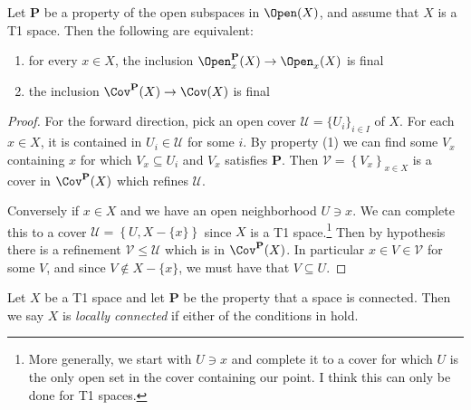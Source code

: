 \documentclass[11pt]{book}
\begin{document}
\begin{proposition}\label{prop:local-properties-cover-properties} 
Let $\mathbf{P}$ be a property of the open subspaces in $\Open(X)$, and assume that $X$ is a T1 space. Then the following are equivalent:
\begin{enumerate}
    \item for every $x\in X$, the inclusion $\Open_x^{\mathbf{P}}(X) \to \Open_x(X)$ is final %
    \item the inclusion $\Cov^{\mathbf{P}}(X) \to \Cov(X)$ is final %
\end{enumerate}
\end{proposition}
\begin{proof} For the forward direction, pick an open cover $\mathcal{U} = \{U_i\}_{i\in I}$ of $X$. For each $x\in X$, it is contained in $U_i\in \mathcal{U}$ for some $i$. By property (1) we can find some $V_x$ containing $x$ for which $V_x \subseteq U_i$ and $V_x$ satisfies $\mathbf{P}$. Then $\mathcal{V} = \left\{ V_x \right\}_{x\in X}$ is a cover in $\Cov^{\mathbf{P}}(X)$ which refines $\mathcal{U}$.

Conversely if $x\in X$ and we have an open neighborhood $U\ni x$. We can complete this to a cover $\mathcal{U} = \left\{ U, X-\{x\} \right\}$ since $X$ is a T1 space.\footnote{More generally, we start with $U\ni x$ and complete it to a cover for which $U$ is the only open set in the cover containing our point. I think this can only be done for T1 spaces.} Then by hypothesis there is a refinement $\mathcal{V} \le \mathcal{U}$ which is in $\Cov^{\mathbf{P}}(X)$. In particular $x\in V \in \mathcal{V}$ for some $V$, and since $V \notin X\minus\{x\}$, we must have that $V \subseteq U$.
\end{proof}

\begin{definition}\label{def:locally-connected} Let $X$ be a T1 space and let \textbf{P} be the property that a space is connected. Then we say $X$ is \emph{locally connected} if either of the conditions in  hold.
\end{definition}
\end{document}

